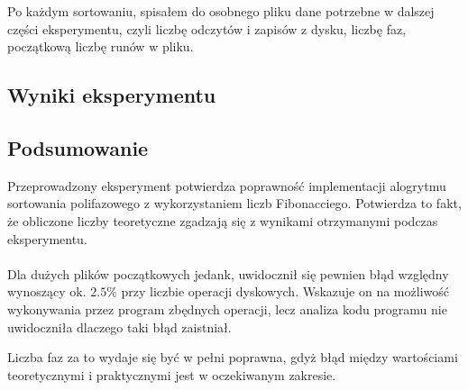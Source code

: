 \documentclass[12pt]{article}
\begin{document}
Po każdym sortowaniu, spisałem do osobnego pliku dane potrzebne w dalszej części eksperymentu, czyli
liczbę odczytów i zapisów z dysku, liczbę faz, początkową liczbę runów w pliku.


\subsection{Wyniki eksperymentu}

\subsection{Podsumowanie}
Przeprowadzony eksperyment potwierdza poprawność implementacji alogrytmu sortowania polifazowego z wykorzystaniem 
liczb Fibonacciego. Potwierdza to fakt, że obliczone liczby teoretyczne zgadzają się z wynikami otrzymanymi podczas eksperymentu.
\\ \\
Dla dużych plików początkowych jedank, uwidocznił się pewnien błąd względny wynoszący ok. \(2.5\%\) przy liczbie operacji dyskowych.
Wskazuje on na możliwość wykonywania przez program zbędnych operacji, lecz analiza kodu programu nie uwidoczniła dlaczego
taki błąd zaistniał.

Liczba faz za to wydaje się być w pełni poprawna, gdyż błąd między wartościami teoretycznymi i praktycznymi jest w oczekiwanym zakresie.
\end{document}
